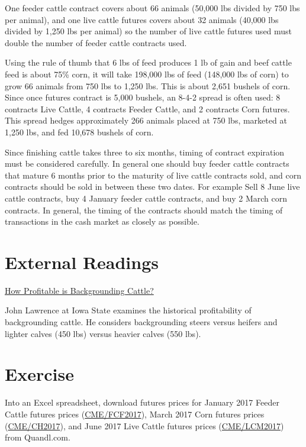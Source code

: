 \documentclass[
]{book}
\begin{document}
One feeder cattle contract covers about 66 animals (50,000 lbs divided by 750 lbs per animal), and one live cattle futures covers about 32 animals (40,000 lbs divided by 1,250 lbs per animal) so the number of live cattle futures used must double the number of feeder cattle contracts used.

Using the rule of thumb that 6 lbs of feed produces 1 lb of gain and beef cattle feed is about 75\% corn, it will take 198,000 lbs of feed (148,000 lbs of corn) to grow 66 animals from 750 lbs to 1,250 lbs. This is about 2,651 bushels of corn. Since once futures contract is 5,000 bushels, an 8-4-2 spread is often used: 8 contracts Live Cattle, 4 contracts Feeder Cattle, and 2 contracts Corn futures. This spread hedges approximately 266 animals placed at 750 lbs, marketed at 1,250 lbs, and fed 10,678 bushels of corn.

Since finishing cattle takes three to six months, timing of contract expiration must be considered carefully. In general one should buy feeder cattle contracts that mature 6 months prior to the maturity of live cattle contracts sold, and corn contracts should be sold in between these two dates. For example Sell 8 June live cattle contracts, buy 4 January feeder cattle contracts, and buy 2 March corn contracts. In general, the timing of the contracts should match the timing of transactions in the cash market as closely as possible.

\hypertarget{external-readings}{%
\section{External Readings}\label{external-readings}}

\href{http://www2.econ.iastate.edu/faculty/lawrence/Acrobat/Backgrounding\%20Cattle.pdf}{How Profitable is Backgrounding Cattle?}

John Lawrence at Iowa State examines the historical profitability of backgrounding cattle. He considers backgrounding steers versus heifers and lighter calves (450 lbs) versus heavier calves (550 lbs).

\hypertarget{exercise}{%
\section{Exercise}\label{exercise}}

Into an Excel spreadsheet, download futures prices for January 2017 Feeder Cattle futures prices (\href{https://www.quandl.com/data/CME/FCF2017}{CME/FCF2017}), March 2017 Corn futures prices (\href{https://www.quandl.com/data/CME/CH2017}{CME/CH2017}), and June 2017 Live Cattle futures prices (\href{https://www.quandl.com/data/CME/LCM2017}{CME/LCM2017}) from Quandl.com.
\end{document}
